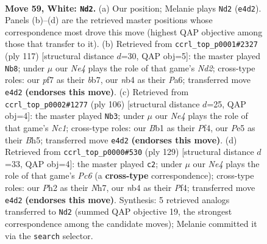 \documentclass[11pt]{article}
\begin{document}
\clearpage

\begin{figure}[p]\centering
\begin{subfigure}{0.46\textwidth}\centering
\resizebox{\linewidth}{!}{%
\newchessgame
\chessboard[
  setfen={5k2/2r2p1p/6p1/1b2P3/1n2NPp1/8/5K1P/1B6 w - - 8 59},
  showmover=false,
  pgfstyle=straightmove, color=movearrow, markmove={e4-d2}
]}
\caption{}
\end{subfigure}\hfill
\begin{subfigure}{0.46\textwidth}\centering
\resizebox{\linewidth}{!}{%
\newchessgame
\chessboard[
  setfen={5k2/1B1n3p/p2P2p1/P7/2p2pP1/2B4P/7K/1b6 b - - 1 59},
  showmover=false,
  pgfstyle=straightmove, color=movearrow, markmove={d7-b8}
]}
\caption{}
\end{subfigure}
\\[4pt]
\begin{subfigure}{0.46\textwidth}\centering
\resizebox{\linewidth}{!}{%
\newchessgame
\chessboard[
  setfen={8/8/3kpp2/p2p1p1B/P4P2/8/4K3/2N3b1 w - - 4 54},
  showmover=false,
  pgfstyle=straightmove, color=movearrow, markmove={c1-b3}
]}
\caption{}
\end{subfigure}\hfill
\begin{subfigure}{0.46\textwidth}\centering
\resizebox{\linewidth}{!}{%
\newchessgame
\chessboard[
  setfen={8/6kn/8/4P3/1P2pp2/P1p4P/6P1/4B1K1 b - - 0 65},
  showmover=false,
  pgfstyle=straightmove, color=movearrow, markmove={c3-c2}
]}
\caption{}
\end{subfigure}
\caption{\textbf{Move 59, White: \texttt{Nd2}.} (a) Our position; Melanie plays \texttt{Nd2} (\texttt{e4d2}). Panels (b)--(d) are the retrieved master positions whose correspondence most drove this move (highest QAP objective among those that transfer to it). (b) Retrieved from \texttt{ccrl\_top\_p0001\#2327} (ply 117) [structural distance $d$=30, QAP obj=5]: the master played \texttt{Nb8}; under $\mu$ our \emph{Ne4} plays the role of that game's \emph{Nd2}; cross-type roles: our \emph{p}f7 as their \emph{b}b7, our \emph{n}b4 as their \emph{P}a6; transferred move \texttt{e4d2} \textbf{(endorses this move)}. (c) Retrieved from \texttt{ccrl\_top\_p0002\#1277} (ply 106) [structural distance $d$=25, QAP obj=4]: the master played \texttt{Nb3}; under $\mu$ our \emph{Ne4} plays the role of that game's \emph{Nc1}; cross-type roles: our \emph{B}b1 as their \emph{P}f4, our \emph{P}e5 as their \emph{B}h5; transferred move \texttt{e4d2} \textbf{(endorses this move)}. (d) Retrieved from \texttt{ccrl\_top\_p0000\#530} (ply 129) [structural distance $d$=33, QAP obj=4]: the master played \texttt{c2}; under $\mu$ our \emph{Ne4} plays the role of that game's \emph{Pc6} (a \textbf{cross-type} correspondence); cross-type roles: our \emph{P}h2 as their \emph{N}h7, our \emph{n}b4 as their \emph{P}f4; transferred move \texttt{e4d2} \textbf{(endorses this move)}. Synthesis: 5 retrieved analogs transferred to \texttt{Nd2} (summed QAP objective 19, the strongest correspondence among the candidate moves); Melanie committed it via the \texttt{search} selector.}
\label{fig:thought-m116}
\end{figure}
\end{document}
